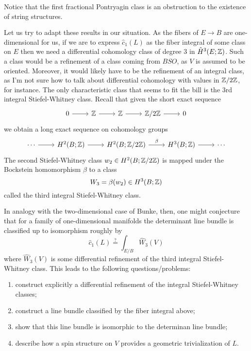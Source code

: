 \documentclass{amsart}
\begin{document}
Notice that the first fractional Pontryagin class is an obstruction to the
existence of string structures.

Let us try to adapt these results in our situation. As the fibers of $E\to B$
are one-dimensional for us, if we are to express $\hat c_1(L)$ as the fiber
integral of some class on $E$ then we need a differential cohomology class
of degree 3 in $\hat H^3(E;\mathbb{Z})$. Such a class would be a refinement of a
class coming from $BSO$, as $V$ is assumed to be oriented. Moreover, it
would likely have to be the refinement of an integral class, as I'm not
sure how to talk about differential cohomology with values in $\mathbb{Z}/2\mathbb{Z}$, for instance.
The only characteristic class that seems to fit the bill is the 3rd integral
Stiefel-Whitney class. Recall that given the short exact sequence
\begin{equation*}
    \begin{tikzcd}
        0\rar & \Z \rar & \Z \rar & \Z/2\Z \rar & 0
    \end{tikzcd}
\end{equation*}
we obtain a long exact sequence on cohomology groups
\begin{equation*}
    \begin{tikzcd}
        \cdots \rar & H^2(B; \Z) \rar & H^2(B; \Z/2\Z) \rar{\beta} & H^3(B;\Z) \rar & \cdots
    \end{tikzcd}
\end{equation*}
The second Stiefel-Whitney class $w_2\in H^2(B;\mathbb{Z}/2\mathbb{Z})$ is mapped under the Bockstein
homomorphism $\beta$ to a class
\begin{equation*}
    W_3=\beta(w_2)\in H^3(B;\mathbb{Z})
\end{equation*}
called the third integral Stiefel-Whitney class.

In analogy with the two-dimensional case of Bunke, then, one might conjecture
that for a family of one-dimensional manifolds the determinant line bundle
is classified up to isomorphism roughly by
\begin{equation*}
    \hat c_1(L) \overset{?}{=} \int_{E/B} \hat W_3(V)
\end{equation*}
where $\hat W_3(V)$ is some differential refinement of the third integral Stiefel-Whitney
class. This leads to the following questions/problems:
\begin{enumerate}
    \item construct explicitly a differential refinement of the integral Stiefel-Whitney classes;
    \item construct a line bundle classified by the fiber integral above;
    \item show that this line bundle is isomorphic to the determinan line bundle;
    \item describe how a spin structure on $V$ provides a geometric trivialization of $L$.
\end{enumerate}
\end{document}
